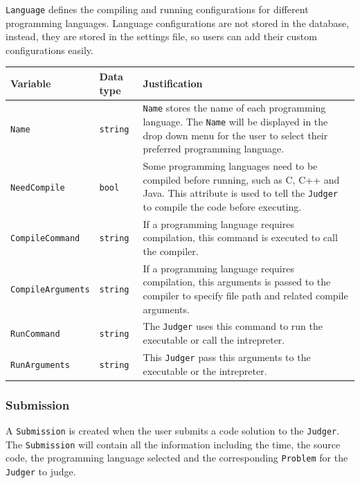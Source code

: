 \documentclass[a4paper]{report}
\begin{document}
\verb|Language| defines the compiling and running configurations for different programming languages. Language configurations are not stored in the database, instead, they are stored in the settings file, so users can add their custom configurations easily.

\begin{tabulary}{\textwidth}{|l|l|L|}
    \hline
    Variable & Data type & Justification \\
    \hline
    \verb|Name| & \verb|string| & \verb|Name| stores the name of each programming language. The \verb|Name| will be displayed in the drop down menu for the user to select their preferred programming language. \\
    \hline
    \verb|NeedCompile| & \verb|bool| & Some programming languages need to be compiled before running, such as C, C++ and Java. This attribute is used to tell the \verb|Judger| to compile the code before executing. \\
    \hline
    \verb|CompileCommand| & \verb|string| & If a programming language requires compilation, this command is executed to call the compiler. \\
    \hline
    \verb|CompileArguments| & \verb|string| & If a programming language requires compilation, this arguments is passed to the compiler to specify file path and related compile arguments. \\
    \hline
    \verb|RunCommand| & \verb|string| & The \verb|Judger| uses this command to run the executable or call the intrepreter. \\
    \hline
    \verb|RunArguments| & \verb|string| & This \verb|Judger| pass this arguments to the executable or the intrepreter. \\
    \hline
\end{tabulary}

\subsubsection{Submission}

A \verb|Submission| is created when the user submits a code solution to the \verb|Judger|. The \verb|Submission| will contain all the information including the time, the source code, the programming language selected and the corresponding \verb|Problem| for the \verb|Judger| to judge.
\end{document}

